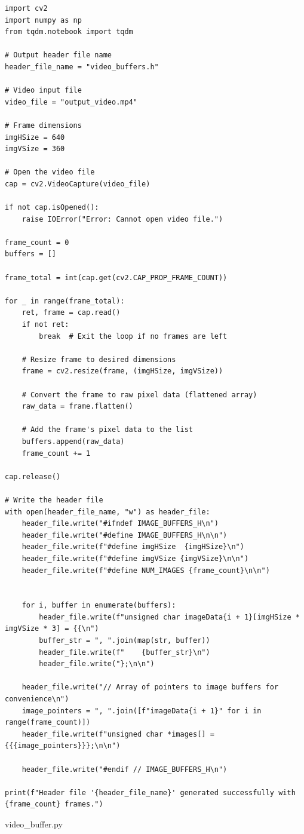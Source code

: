 \documentclass{article}
\newenvironment{longlisting}{\captionsetup{type=listing}}{}
\begin{document}
\begin{longlisting}
    \begin{verbatim}
import cv2
import numpy as np
from tqdm.notebook import tqdm

# Output header file name
header_file_name = "video_buffers.h"

# Video input file
video_file = "output_video.mp4"

# Frame dimensions
imgHSize = 640
imgVSize = 360

# Open the video file
cap = cv2.VideoCapture(video_file)

if not cap.isOpened():
    raise IOError("Error: Cannot open video file.")

frame_count = 0
buffers = []

frame_total = int(cap.get(cv2.CAP_PROP_FRAME_COUNT))

for _ in range(frame_total):
    ret, frame = cap.read()
    if not ret:
        break  # Exit the loop if no frames are left

    # Resize frame to desired dimensions
    frame = cv2.resize(frame, (imgHSize, imgVSize))

    # Convert the frame to raw pixel data (flattened array)
    raw_data = frame.flatten()

    # Add the frame's pixel data to the list
    buffers.append(raw_data)
    frame_count += 1

cap.release()

# Write the header file
with open(header_file_name, "w") as header_file:
    header_file.write("#ifndef IMAGE_BUFFERS_H\n")
    header_file.write("#define IMAGE_BUFFERS_H\n\n")
    header_file.write(f"#define imgHSize  {imgHSize}\n")
    header_file.write(f"#define imgVSize {imgVSize}\n\n")
    header_file.write(f"#define NUM_IMAGES {frame_count}\n\n")


    for i, buffer in enumerate(buffers):
        header_file.write(f"unsigned char imageData{i + 1}[imgHSize * imgVSize * 3] = {{\n")
        buffer_str = ", ".join(map(str, buffer))
        header_file.write(f"    {buffer_str}\n")
        header_file.write("};\n\n")

    header_file.write("// Array of pointers to image buffers for convenience\n")
    image_pointers = ", ".join([f"imageData{i + 1}" for i in range(frame_count)])
    header_file.write(f"unsigned char *images[] = {{{image_pointers}}};\n\n")

    header_file.write("#endif // IMAGE_BUFFERS_H\n")

print(f"Header file '{header_file_name}' generated successfully with {frame_count} frames.")
    \end{verbatim}
\caption{video\_buffer.py}
\label{code:videobuffergen}
\end{longlisting}

\printbibliography
\end{document}
